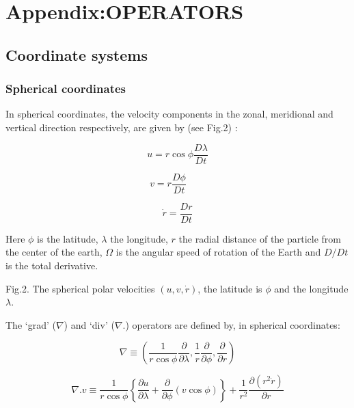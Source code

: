 
\section{Appendix:OPERATORS}

\subsection{Coordinate systems}

\subsubsection{Spherical coordinates}

In spherical coordinates, the velocity components in the zonal, meridional
and vertical direction respectively, are given by (see Fig.2) :

\[
u=r\cos \phi \frac{D\lambda }{Dt} 
\]

\[
v=r\frac{D\phi }{Dt}\qquad 
\]
$\qquad \qquad \qquad \qquad $

\[
\dot{r}=\frac{Dr}{Dt} 
\]

Here $\phi $ is the latitude, $\lambda $ the longitude, $r$ the radial
distance of the particle from the center of the earth, $\Omega $ is the
angular speed of rotation of the Earth and $D/Dt$ is the total derivative.

Fig.2. The spherical polar velocities $(u,v,\dot{r})$, the latitude is $\phi 
$ and the longitude $\lambda $.

The `grad' ($\nabla $) and `div' ($\nabla $.) operators are defined by, in
spherical coordinates:

\[
\nabla \equiv \left( \frac{1}{r\cos \phi }\frac{\partial }{\partial \lambda }
,\frac{1}{r}\frac{\partial }{\partial \phi },\frac{\partial }{\partial r}
\right) 
\]

\[
\nabla .v\equiv \frac{1}{r\cos \phi }\left\{ \frac{\partial u}{\partial
\lambda }+\frac{\partial }{\partial \phi }\left( v\cos \phi \right) \right\}
+\frac{1}{r^{2}}\frac{\partial \left( r^{2}\dot{r}\right) }{\partial r} 
\]

